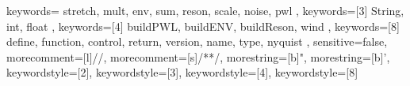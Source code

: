 

{
	keywords={
		stretch,
		mult,
		env,
		sum,
		reson,
		scale,
		noise,
		pwl
	},
	keywords=[3]{
		String,
		int,
		float
	},
	keywords=[4]{
		buildPWL,
		buildENV,
		buildReson,
		wind
	},
	keywords=[8]{
		define,
		function,
		control,
		return,
		version,
		name,
		type,
		nyquist
	},
	sensitive=false, %
	morecomment=[l]{//}, %
	morecomment=[s]{/*}{*/}, %
	morestring=[b]", %
	morestring=[b]', %
	keywordstyle=[2]\color{codeOrange},
	keywordstyle=[3]\color{codePurple},
	keywordstyle=[4]\color{codeGreen},
	keywordstyle=[8]\color{codeGray}
}